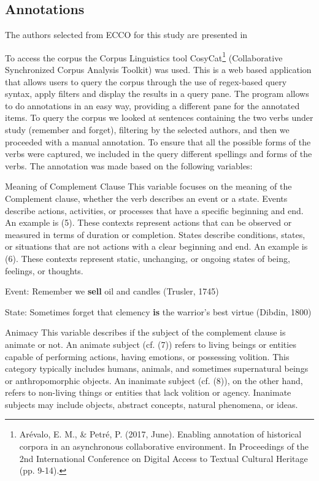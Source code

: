 \documentclass[final]{clv3} %
\begin{document}
\subsection{Annotations}

The authors  selected from ECCO for this study are presented in 

To access the corpus the Corpus Linguistics tool CosyCat\footnote[1]{Arévalo, E. M., & Petré, P. (2017, June). Enabling annotation of historical corpora in an asynchronous collaborative environment. In Proceedings of the 2nd International Conference on Digital Access to Textual Cultural Heritage (pp. 9-14).} (Collaborative Synchronized Corpus Analysis Toolkit) was used. This is a web based application that allows users to query the corpus through the use of regex-based query syntax, apply filters and display the results in a query pane. The program allows to do annotations in an easy way, providing a different pane for the annotated items.
To query the corpus we looked at sentences containing the two verbs under study (remember and forget), filtering by the selected authors, and then we proceeded with a manual annotation. To ensure that all the possible forms of the verbs were captured, we included in the query different spellings and forms of the verbs.
The annotation was made based on the following variables:

\item{Meaning of Complement Clause} This variable focuses on the meaning of the Complement clause, whether the verb describes an event or a state. Events describe actions, activities, or processes that have a specific beginning and end. An example is (5). These contexts represent actions that can be observed or measured in terms of duration or completion. States describe conditions, states, or situations that are not actions with a clear beginning and end. An example is (6). These contexts represent static, unchanging, or ongoing states of being, feelings, or thoughts. 

\begin{example}
Event: Remember we \textbf{sell} oil and candles (Trusler, 1745)
\end{example}

\begin{example}
State: Sometimes forget that clemency \textbf{is} the warrior's best virtue (Dibdin, 1800)
\end{example}

\item {Animacy} This variable describes if the subject of the complement clause is animate or not. An animate subject (cf. (7)) refers to living beings or entities capable of performing actions, having emotions, or possessing volition. This category typically includes humans, animals, and sometimes supernatural beings or anthropomorphic objects. An inanimate subject (cf. (8)), on the other hand, refers to non-living things or entities that lack volition or agency. Inanimate subjects may include objects, abstract concepts, natural phenomena, or ideas.
\end{document}
